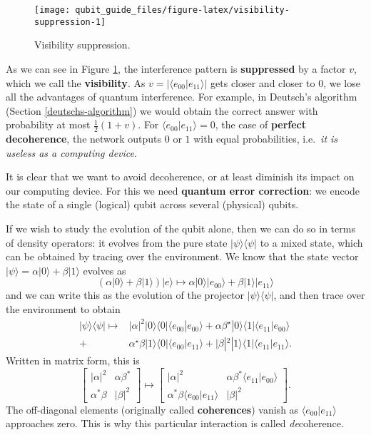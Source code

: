 \documentclass[fleqn]{article}
\newenvironment{idea}{\noindent}{\medskip}
\begin{document}
\begin{figure}[H]

{\centering \texttt{[image: qubit\_guide\_files/figure-latex/visibility-suppression-1]} 

}

\caption{Visibility suppression.}\label{fig:visibility-suppression}
\end{figure}

As we can see in Figure \ref{fig:visibility-suppression}, the interference pattern is \textbf{suppressed} by a factor \(v\), which we call the \textbf{visibility}.
As \(v=|\langle e_{00}|e_{11}\rangle|\) gets closer and closer to \(0\), we lose all the advantages of quantum interference.
For example, in Deutsch's algorithm (Section \ref{deutschs-algorithm}) we would obtain the correct answer with probability at most \(\frac{1}{2}(1+v)\).
For \(\langle e_{00}|e_{11}\rangle = 0\), the case of \textbf{perfect decoherence}, the network outputs \(0\) or \(1\) with equal probabilities, i.e.~\emph{it is useless as a computing device}.

\begin{idea}
It is clear that we want to avoid decoherence, or at least diminish its impact on our computing device.
For this we need \textbf{quantum error correction}: we encode the state of a single (logical) qubit across several (physical) qubits.

\end{idea}

If we wish to study the evolution of the qubit alone, then we can do so in terms of density operators: it evolves from the pure state \(|\psi\rangle\langle\psi|\) to a mixed state, which can be obtained by tracing over the environment.
We know that the state vector \(|\psi\rangle=\alpha|0\rangle+\beta|1\rangle\) evolves as
\[
  \left( \alpha|0\rangle +\beta |1\rangle\right)|e\rangle \longmapsto
  \alpha |0\rangle|e_{00}\rangle +\beta |1\rangle |e_{11}\rangle
\]
and we can write this as the evolution of the projector \(|\psi\rangle\langle\psi|\), and then trace over the environment to obtain
\[
  \begin{aligned}
    |\psi\rangle\langle\psi| \longmapsto & |\alpha|^2|0\rangle\langle 0| \langle e_{00}|e_{00}\rangle+ \alpha\beta^\star |0\rangle\langle 1|\langle e_{11}|e_{00}\rangle
  \\+ &\alpha^\star\beta |1\rangle\langle 0|\langle e_{00}|e_{11}\rangle  + |\beta|^2|1\rangle\langle 1|\langle e_{11}|e_{11}\rangle.
  \end{aligned}
\]
Written in matrix form, this is
\[
  \begin{bmatrix}
    |\alpha|^2 & \alpha\beta^\ast
  \\\alpha^\ast\beta & |\beta|^2
  \end{bmatrix}
  \longmapsto
  \begin{bmatrix}
    |\alpha|^2 & \alpha\beta^\ast \langle e_{11}|e_{00}\rangle
    \\\alpha^\ast\beta \langle e_{00}|e_{11}\rangle & |\beta|^2
  \end{bmatrix}.
\]
The off-diagonal elements (originally called \textbf{coherences}) vanish as \(\langle e_{00}|e_{11}\rangle\) approaches zero.
This is why this particular interaction is called \emph{de}coherence.
\end{document}
